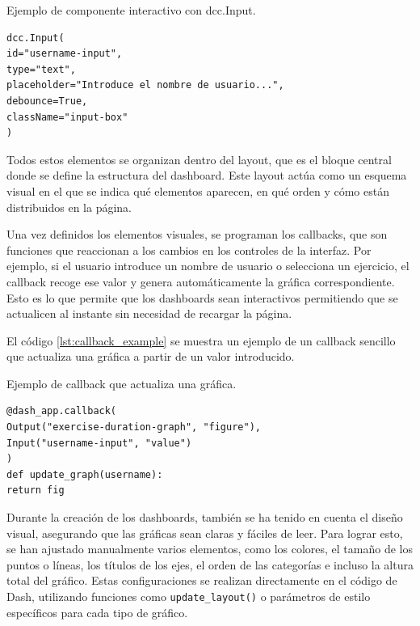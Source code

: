 \documentclass[a4paper, 12pt]{book}
\begin{document}
\begin{listing}[h!]
\caption{Ejemplo de componente interactivo con dcc.Input.}{}
\label{lst:dcc_input_example}
\begin{verbatim}
dcc.Input(
id="username-input",
type="text",
placeholder="Introduce el nombre de usuario...",
debounce=True,
className="input-box"
)
\end{verbatim}
\end{listing}

Todos estos elementos se organizan dentro del layout, que es el bloque central donde se define la estructura del dashboard. Este layout actúa como un esquema visual en el que se indica qué elementos aparecen, en qué orden y cómo están distribuidos en la página.

Una vez definidos los elementos visuales, se programan los callbacks, que son funciones que reaccionan a los cambios en los controles de la interfaz. Por ejemplo, si el usuario introduce un nombre de usuario o selecciona un ejercicio, el callback recoge ese valor y genera automáticamente la gráfica correspondiente. Esto es lo que permite que los dashboards sean interactivos permitiendo que se actualicen al instante sin necesidad de recargar la página.

El código \ref{lst:callback_example} se muestra un ejemplo de un callback sencillo que actualiza una gráfica a partir de un valor introducido.

\begin{listing}[h!]
\caption{Ejemplo de callback que actualiza una gráfica.}{}
\label{lst:callback_example}
\begin{verbatim}
@dash_app.callback(
Output("exercise-duration-graph", "figure"),
Input("username-input", "value")
)
def update_graph(username):
return fig
\end{verbatim}
\end{listing}

Durante la creación de los dashboards, también se ha tenido en cuenta el diseño visual, asegurando que las gráficas sean claras y fáciles de leer. Para lograr esto, se han ajustado manualmente varios elementos, como los colores, el tamaño de los puntos o líneas, los títulos de los ejes, el orden de las categorías e incluso la altura total del gráfico. Estas configuraciones se realizan directamente en el código de Dash, utilizando funciones como \texttt{update\_layout()} o parámetros de estilo específicos para cada tipo de gráfico.
\end{document}
